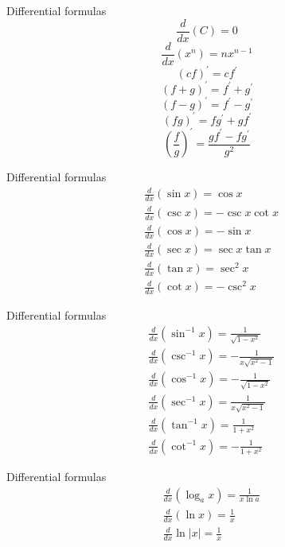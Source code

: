 \documentclass{beamer}
\begin{document}
\begin{frame}{Differential formulas}
    $$
    \frac{d}{d x}(C)=0 
    $$$$
    \frac{d}{d x}(x^{n})=n x^{n-1}
    $$$$
    (c f)^{\prime}=c f^{\prime}
    $$$$
    (f+g)^{\prime}=f^{\prime}+g^{\prime}
    $$$$
    (f-g)^{\prime}=f^{\prime}-g^{\prime}
    $$$$
    (f g)^{\prime}=f g^{\prime}+g f^{\prime}
    $$$$
    (\frac{f}{g})^{\prime}=\frac{g f^{\prime}-f g^{\prime}}{g^{2}}
    $$
\end{frame}

\begin{frame}{Differential formulas}
    $$
    \begin{aligned}
    &\frac{d}{d x}(\sin x)=\cos x \\
    &\frac{d}{d x}(\csc x)=-\csc x \cot x \\
    &\frac{d}{d x}(\cos x)=-\sin x \\
    &\frac{d}{d x}(\sec x)=\sec x \tan x \\
    &\frac{d}{d x}(\tan x)=\sec ^{2} x \\
    &\frac{d}{d x}(\cot x)=-\csc ^{2} x
    \end{aligned}
    $$
\end{frame}

\begin{frame}{Differential formulas}
    $$
    \begin{aligned}
    &\frac{d}{d x}\left(\sin ^{-1} x\right)=\frac{1}{\sqrt{1-x^{2}}} \\
    &\frac{d}{d x}\left(\csc ^{-1} x\right)=-\frac{1}{x \sqrt{x^{2}-1}} \\
    &\frac{d}{d x}\left(\cos ^{-1} x\right)=-\frac{1}{\sqrt{1-x^{2}}} \\
    &\frac{d}{d x}\left(\sec ^{-1} x\right)=\frac{1}{x \sqrt{x^{2}-1}} \\
    &\frac{d}{d x}\left(\tan ^{-1} x\right)=\frac{1}{1+x^{2}} \\
    &\frac{d}{d x}\left(\cot ^{-1} x\right)=-\frac{1}{1+x^{2}}
    \end{aligned}
    $$
\end{frame}

\begin{frame}{Differential formulas}
    $$
    \begin{aligned}
    &\frac{d}{d x}\left(\log _{a} x\right)=\frac{1}{x \ln a} \\
    &\frac{d}{d x}(\ln x)=\frac{1}{x} \\
    &\frac{d}{d x} \ln |x|=\frac{1}{x} \\
    \end{aligned}
    $$
\end{frame}
\end{document}
